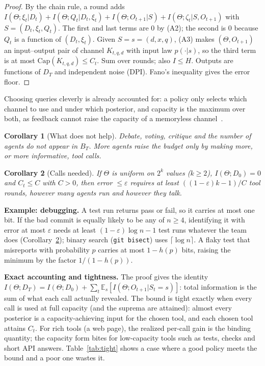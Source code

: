 \documentclass[conference]{IEEEtran}
\newtheorem{corollary}{Corollary}
\theoremstyle{definition}
\newcommand{\I}{I}
\newcommand{\Hh}{H}
\newcommand{\E}{\mathbb{E}}
\begin{document}
\begin{proof}
By the chain rule, a round adds
$\I(\Theta;\xi_t|D_t)+\I(\Theta;Q_t|D_t,\xi_t)+\I(\Theta;O_{t+1}|S)+\I(\Theta;\zeta_t|S,O_{t+1})$
with $S=(D_t,\xi_t,Q_t)$. The first and last terms are $0$ by (A2); the second
is $0$ because $Q_t$ is a function of $(D_t,\xi_t)$. Given $S=s=(d,x,q)$, (A3)
makes $(\Theta,O_{t+1})$ an input--output pair of channel $K_{t,q,d}$ with input
law $p(\cdot|s)$, so the third term is at most $\mathrm{Cap}(K_{t,q,d})\le C_t$.
Sum over rounds; also $\I\le\Hh$. Outputs are functions of $D_T$ and independent
noise (DPI). Fano's inequality gives the error floor.
\end{proof}

Choosing queries cleverly is already accounted for: a policy only selects which
channel to use and under which posterior, and capacity is the maximum over both,
as feedback cannot raise the capacity of a memoryless
channel~\cite{shannon1956,massey1990}.

\begin{corollary}[What does not help]\label{cor:agents}
Debate, voting, critique and the number of agents do not appear in $B_T$. More
agents raise the budget only by making more, or more informative, tool calls.
\end{corollary}

\begin{corollary}[Calls needed]\label{cor:rounds}
If $\Theta$ is uniform on $2^k$ values ($k\ge2$), $\I(\Theta;D_0)=0$ and $C_t\le
C$ with $C>0$, then error $\le\varepsilon$ requires at least $((1-\varepsilon)k-1)/C$ tool
rounds, however many agents run and however they talk.
\end{corollary}

\noindent\textbf{Example: debugging.} A test run returns pass or fail, so it
carries at most one bit. If the bad commit is equally likely to be any of $n\ge4$, identifying it
with error at most $\varepsilon$ needs at least $(1-\varepsilon)\log n-1$ test
runs whatever the team does (Corollary~\ref{cor:rounds}); binary search
(\texttt{git bisect}) uses $\lceil\log n\rceil$. A flaky test that misreports with probability $p$ carries at most
$1-h(p)$ bits, raising the minimum by the factor $1/(1-h(p))$.

\noindent\textbf{Exact accounting and tightness.} The proof gives the identity
$\I(\Theta;D_T)=\I(\Theta;D_0)+\sum_t\E_s[\I(\Theta;O_{t+1}|S_t=s)]$: total
information is the sum of what each call actually revealed. The bound is tight
exactly when every call is used at full capacity (and the suprema are attained): almost every posterior is a
capacity-achieving input for the chosen tool, and each chosen tool attains
$C_t$. For rich tools (a web page),
the realized per-call gain is the binding quantity; the capacity form bites for
low-capacity tools such as tests, checks and short API answers.
Table~\ref{tab:tight} shows a case where a good policy meets the bound and a
poor one wastes it.
\end{document}
